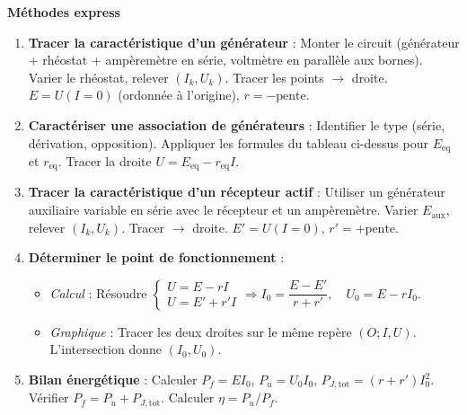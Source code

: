 \documentclass[11pt]{article}
\begin{document}
\begin{bilan}
\textbf{Méthodes express}
\begin{enumerate}
    \item \textbf{Tracer la caractéristique d'un générateur} : Monter le circuit (générateur + rhéostat + ampèremètre en série, voltmètre en parallèle aux bornes). Varier le rhéostat, relever $(I_k, U_k)$. Tracer les points $\to$ droite. $E = U(I=0)$ (ordonnée à l'origine), $r = -\text{pente}$.
    \item \textbf{Caractériser une association de générateurs} : Identifier le type (série, dérivation, opposition). Appliquer les formules du tableau ci-dessus pour $E_{\text{eq}}$ et $r_{\text{eq}}$. Tracer la droite $U = E_{\text{eq}} - r_{\text{eq}} I$.
    \item \textbf{Tracer la caractéristique d'un récepteur actif} : Utiliser un générateur auxiliaire variable en série avec le récepteur et un ampèremètre. Varier $E_{\text{aux}}$, relever $(I_k, U_k)$. Tracer $\to$ droite. $E' = U(I=0)$, $r' = +\text{pente}$.
    \item \textbf{Déterminer le point de fonctionnement} :
    \begin{itemize}
        \item \emph{Calcul} : Résoudre $\begin{cases} U = E - r I \\ U = E' + r' I \end{cases} \Rightarrow I_0 = \dfrac{E - E'}{r + r'},\quad U_0 = E - r I_0$.
        \item \emph{Graphique} : Tracer les deux droites sur le même repère $(O; I, U)$. L'intersection donne $(I_0, U_0)$.
    \end{itemize}
    \item \textbf{Bilan énergétique} : Calculer $P_f = E I_0$, $P_u = U_0 I_0$, $P_{J,\text{tot}} = (r+r') I_0^2$. Vérifier $P_f = P_u + P_{J,\text{tot}}$. Calculer $\eta = P_u / P_f$.
\end{enumerate}

\end{bilan}
\end{document}
